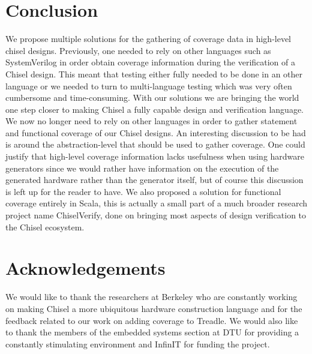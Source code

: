 \documentclass[conference]{IEEEtran}
\begin{document}
\section{Conclusion}
We propose multiple solutions for the gathering of coverage data in high-level chisel designs. Previously, one needed to rely on other languages such as SystemVerilog in order obtain coverage information during the verification of a Chisel design. This meant that testing either fully needed to be done in an other language or we needed to turn to multi-language testing which was very often cumbersome and time-consuming. With our solutions we are bringing the world one step closer to making Chisel a fully capable design and verification language. We now no longer need to rely on other languages in order to gather statement and functional coverage of our Chisel designs. An interesting discussion to be had is around the abstraction-level that should be used to gather coverage. One could justify that high-level coverage information lacks usefulness when using hardware generators since we would rather have information on the execution of the generated hardware rather than the generator itself, but of course this discussion is left up for the reader to have. We also proposed a solution for functional coverage entirely in Scala, this is actually a small part of a much broader research project name ChiselVerify, done on bringing most aspects of design verification to the Chisel ecosystem.

\section{Acknowledgements}
We would like to thank the researchers at Berkeley who are constantly working on making Chisel a more ubiquitous hardware construction language and for the feedback related to our work on adding coverage to Treadle. We would also like to thank the members of the embedded systems section at DTU for providing a constantly stimulating environment and InfinIT for funding the project.



\end{document}
